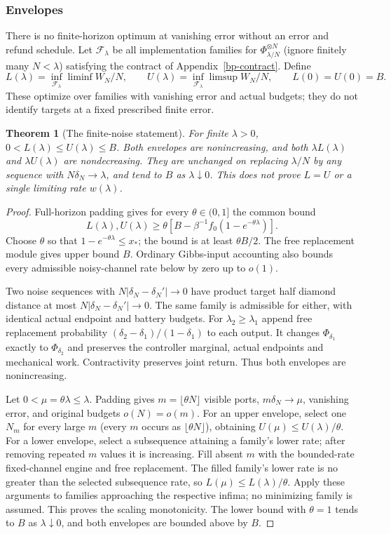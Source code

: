 \documentclass[11pt]{article}
\newtheorem{theorem}{Theorem}
\theoremstyle{definition}
\theoremstyle{remark}
\begin{document}
\subsubsection{Envelopes}
There is no finite-horizon optimum at vanishing error without an
error and refund schedule. Let $\mathcal F_\lambda$ be all
implementation families for $\Phi_{\lambda/N}^{\otimes N}$
(ignore finitely many $N<\lambda$) satisfying the contract of Appendix~\ref{bp-contract}.
Define
\[
 L(\lambda)=\inf_{\mathcal F_\lambda}\liminf W_N/N,\qquad
 U(\lambda)=\inf_{\mathcal F_\lambda}\limsup W_N/N,
 \qquad L(0)=U(0)=B.
\]
These optimize over families with vanishing error and actual budgets;
they do not identify targets at a fixed prescribed finite error.

\begin{theorem}[The finite-noise statement]\label{bp-envelopes}
For finite $\lambda>0$, $0<L(\lambda)\le U(\lambda)\le B$.
Both envelopes are nonincreasing, and both
$\lambda L(\lambda)$ and $\lambda U(\lambda)$ are nondecreasing.
They are unchanged on replacing $\lambda/N$ by any sequence with
$N\delta_N\to\lambda$, and tend to $B$ as $\lambda\downarrow0$.
This does not prove $L=U$ or a single limiting rate $w(\lambda)$.
\end{theorem}
\begin{proof}
Full-horizon padding gives for every $\theta\in(0,1]$ the common bound
\[
 L(\lambda),U(\lambda)\ge
 \theta[B-\beta^{-1}f_0(1-e^{-\theta\lambda})].
\]
Choose $\theta$ so that $1-e^{-\theta\lambda}\le x_*$; the bound
is at least $\theta B/2$. The free replacement module gives upper
bound $B$. Ordinary Gibbs-input accounting also bounds every
admissible noisy-channel rate below by zero up to $o(1)$.

Two noise sequences with $N|\delta_N-\delta_N'|\to0$ have product
target half diamond distance at most $N|\delta_N-\delta_N'|\to0$.
The same family is admissible for either, with identical actual
endpoint and battery budgets. For $\lambda_2\ge\lambda_1$ append
free replacement probability $(\delta_2-\delta_1)/(1-\delta_1)$
to each output. It changes $\Phi_{\delta_1}$ exactly to
$\Phi_{\delta_2}$ and preserves the controller marginal, actual
endpoints and mechanical work. Contractivity preserves joint return.
Thus both envelopes are nonincreasing.

Let $0<\mu=\theta\lambda\le\lambda$.
Padding gives $m=\lfloor\theta N\rfloor$ visible ports,
$m\delta_N\to\mu$, vanishing error, and original budgets $o(N)=o(m)$.
For an upper envelope, select one $N_m$ for every large $m$
(every $m$ occurs as $\lfloor\theta N\rfloor$), obtaining
$U(\mu)\le U(\lambda)/\theta$.
For a lower envelope, select a subsequence attaining a family's
lower rate; after removing repeated $m$ values it is increasing.
Fill absent $m$ with the bounded-rate fixed-channel engine and
free replacement. The filled family's lower rate is no greater
than the selected subsequence rate, so
$L(\mu)\le L(\lambda)/\theta$. Apply these arguments to families
approaching the respective infima; no minimizing family is assumed.
This proves the scaling monotonicity.
The lower bound with $\theta=1$ tends to $B$ as $\lambda\downarrow0$,
and both envelopes are bounded above by $B$.
\end{proof}
\end{document}
